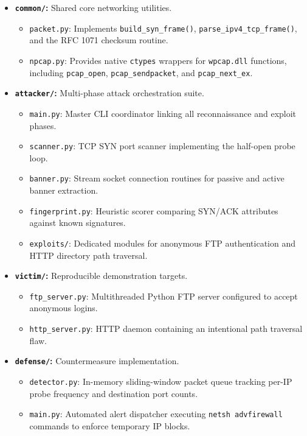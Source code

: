 \documentclass[11pt,a4paper]{article}
\begin{document}
\begin{itemize}
    \item \textbf{\texttt{common/}:} Shared core networking utilities.
    \begin{itemize}
        \item \texttt{packet.py}: Implements \texttt{build\_syn\_frame()}, \texttt{parse\_ipv4\_tcp\_frame()}, and the RFC 1071 checksum routine.
        \item \texttt{npcap.py}: Provides native \texttt{ctypes} wrappers for \texttt{wpcap.dll} functions, including \texttt{pcap\_open}, \texttt{pcap\_sendpacket}, and \texttt{pcap\_next\_ex}.
    \end{itemize}
    \item \textbf{\texttt{attacker/}:} Multi-phase attack orchestration suite.
    \begin{itemize}
        \item \texttt{main.py}: Master CLI coordinator linking all reconnaissance and exploit phases.
        \item \texttt{scanner.py}: TCP SYN port scanner implementing the half-open probe loop.
        \item \texttt{banner.py}: Stream socket connection routines for passive and active banner extraction.
        \item \texttt{fingerprint.py}: Heuristic scorer comparing SYN/ACK attributes against known signatures.
        \item \texttt{exploits/}: Dedicated modules for anonymous FTP authentication and HTTP directory path traversal.
    \end{itemize}
    \item \textbf{\texttt{victim/}:} Reproducible demonstration targets.
    \begin{itemize}
        \item \texttt{ftp\_server.py}: Multithreaded Python FTP server configured to accept anonymous logins.
        \item \texttt{http\_server.py}: HTTP daemon containing an intentional path traversal flaw.
    \end{itemize}
    \item \textbf{\texttt{defense/}:} Countermeasure implementation.
    \begin{itemize}
        \item \texttt{detector.py}: In-memory sliding-window packet queue tracking per-IP probe frequency and destination port counts.
        \item \texttt{main.py}: Automated alert dispatcher executing \texttt{netsh advfirewall} commands to enforce temporary IP blocks.
    \end{itemize}
\end{itemize}
\end{document}
